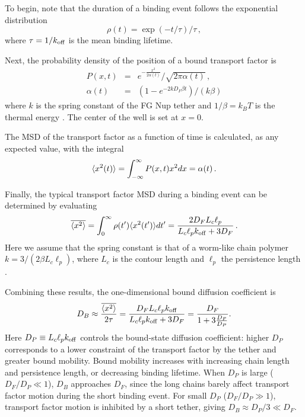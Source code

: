 To begin, note that the duration of a binding event follows the exponential distribution 
\begin{equation}
\rho (t) = \exp(-t/\tau)/\tau\,,
\end{equation}
where $\tau = 1/k_{\rm off}$ is the mean binding lifetime.

Next, the probability density of the position of a bound transport factor is 
\begin{eqnarray}
P(x,t) &=& e^{-\frac{x^2}{2 \alpha(t)}}/\sqrt{2\pi \alpha(t)}\,,\\
\alpha(t) &=& (1-e^{-2kD_F\beta t})/(k\beta)
\end{eqnarray}
 where $k$ is the spring constant of the FG Nup tether and $1/\beta = k_BT$ is the thermal energy \cite{doi88}.  The center of the well is set at $x=0$.

The MSD of the transport factor as a function of time is calculated, as any expected value, with the integral
\begin{equation}
\langle x^2(t) \rangle = \int_{-\infty}^{\infty} P(x,t) x^2 dx = \alpha(t)\,.
\end{equation}

Finally, the typical transport factor MSD during a binding event can be determined by evaluating
\begin{equation}\label{eq:sho}
  \overline{\langle x^2 \rangle} = \int_0^{\infty} \rho(t') \langle x^2(t') \rangle dt' = \frac{2D_F L_c
    \ell_p}{L_c \ell_p k_{\rm off}+ 3D_F}\,. 
\end{equation} %
Here we assume that the spring constant is that of a worm-like chain polymer $k = 3/(2\beta L_c \ell_p)$, where $L_c$ is the contour length and $\ell_p$ the persistence length \cite{howard01}.

Combining these results, the one-dimensional bound diffusion coefficient is
\begin{equation}\label{eq:dbound}
  D_B \approx \frac{\overline{\langle x^2 \rangle}}{2\tau} = \frac{D_F L_c \ell_p
    k_{\mathrm{off}}}{L_c \ell_p k_{\mathrm{off}} + 3D_F} =
  \frac{D_F}{1+3\frac{D_F}{D_{P}}}.  
\end{equation}
Here $D_P \equiv L_c \ell_p k_{\mathrm{off}}$ controls the bound-state diffusion coefficient: higher $D_P$ corresponds to a lower constraint of the transport factor by the tether and greater bound mobility. Bound mobility increases with increasing chain length and persistence length, or decreasing binding lifetime. When $D_P$ is large ($D_F/D_P\ll1$), $D_B$ approaches $D_F$, since the long chains barely affect transport factor motion during the short binding event. For small $D_P$ ($D_F/D_P\gg1$), transport factor motion is inhibited by a short tether, giving $D_B\approx D_P/3\ll D_F$.  


